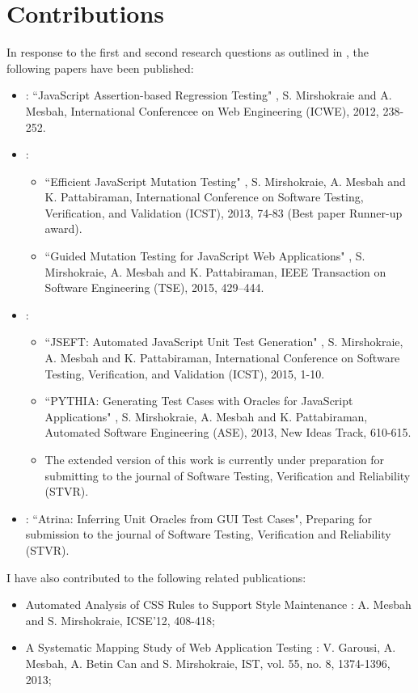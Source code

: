 \section{Contributions} \label{Sec:contrib}
In response to the first and second research questions as outlined in , the following papers have been published:
\begin{itemize}
\item {}: ``JavaScript Assertion-based Regression Testing" \cite{mirshokraie:icwe12},
S. Mirshokraie and A. Mesbah, International Conferencee on Web Engineering (ICWE), 2012, 238-252.
\item {}:
\begin{itemize}
\item ``Efficient JavaScript Mutation Testing" \cite{mirshokraie:icst13},
S. Mirshokraie, A. Mesbah and K. Pattabiraman, International Conference on Software Testing, Verification, and Validation (ICST), 2013, 74-83 (Best paper Runner-up award).
\item ``Guided Mutation Testing for JavaScript Web Applications" \cite{mirshokraie:tse15},
S. Mirshokraie, A. Mesbah and K. Pattabiraman, IEEE Transaction on Software Engineering (TSE), 2015, 429–444.
\end{itemize}
\item {}:
\begin{itemize}
\item ``JSEFT: Automated JavaScript Unit Test Generation" \cite{mirshokraie:icst15},
S. Mirshokraie, A. Mesbah and K. Pattabiraman, International Conference on Software Testing, Verification, and Validation (ICST), 2015, 1-10.
\item ``PY\-THIA: Generating Test Cases with Oracles
for JavaScript Applications" \cite{shabnam:ase13},
S. Mirshokraie, A. Mesbah and K. Pattabiraman, Automated Software Engineering (ASE), 2013, New Ideas Track, 610-615.
\item The extended version of this work is currently under preparation for submitting to the journal of Software Testing, Verification and Reliability (STVR). 
\end{itemize} 
\item {}: ``Atrina: Inferring Unit Oracles from GUI Test Cases", Preparing for submission to the journal of Software Testing, Verification and Reliability (STVR).
\end{itemize}

I have also contributed to the following related publications:
\begin{itemize}
\item Automated Analysis of CSS Rules to Support Style Maintenance \cite{mesbah:icse12}: 
A. Mesbah and S. Mirshokraie, ICSE'12, 408-418;
\item A Systematic Mapping Study of Web Application Testing \cite{garousi:ist13}: 
V. Garousi, A. Mesbah, A. Betin Can and S. Mirshokraie, IST, vol. 55, no. 8, 1374-1396, 2013;
\end{itemize}
